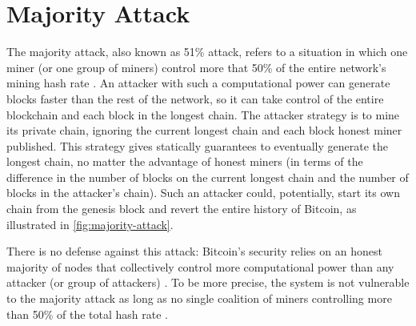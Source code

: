 \section{Majority Attack}
\label{sec:majority-attack}
The majority attack, also known as \num{51}\% attack, refers to a situation in which one miner (or one group of miners) control more that \num{50}\% of the entire network's mining hash rate \cite{majority_investopedia, majority_bitcoin_wiki}.
An attacker with such a computational power can generate blocks faster than the rest of the network, so it can take control of the entire blockchain and each block in the longest chain.
The attacker strategy is to mine its private chain, ignoring the current longest chain and each block honest miner published.
This strategy gives statically guarantees to eventually generate the longest chain, no matter the advantage of honest miners (in terms of the difference in the number of blocks on the current longest chain and the number of blocks in the attacker's chain).
Such an attacker could, potentially, start its own chain from the genesis block and revert the entire history of Bitcoin, as illustrated in \cref{fig:majority-attack}.

There is no defense against this attack:
Bitcoin's security relies on an honest majority of nodes that collectively control more computational power than any attacker (or group of attackers) \cite{bitcoin_2009}.
To be more precise, the system is not vulnerable to the majority attack as long as no single coalition of miners controlling more than \num{50}\% of the total hash rate \cite{bitcoin_wiki_irreversible_transactions}.

